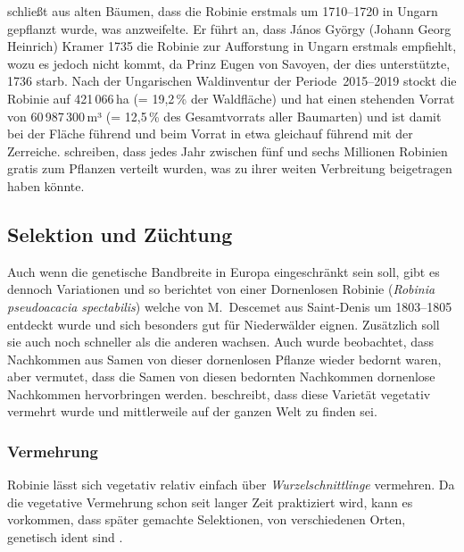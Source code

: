 \documentclass[twocolumn]{scrartcl}
\begin{document}
\citet[S.~3]{vadas1911robinie} schließt aus alten Bäumen, dass
die Robinie erstmals um 1710--1720 in Ungarn gepflanzt wurde, was
\citet[S.~179]{ernyey1926robinie} anzweifelte. Er führt an, dass
János György (Johann Georg Heinrich) Kramer 1735 die Robinie zur
Aufforstung in Ungarn erstmals empfiehlt, wozu es jedoch nicht kommt, da
Prinz Eugen von Savoyen, der dies unterstützte, 1736 starb. Nach der
Ungarischen Waldinventur \citep{waldinventur20152019ungarn} der
Periode~2015--2019 stockt die Robinie auf
421\,066\,ha (= 19,2\,\% der Waldfläche) und hat einen stehenden Vorrat von
60\,987\,300\,m³ (= 12,5\,\% des Gesamtvorrats aller Baumarten) und ist
damit bei der Fläche führend und beim Vorrat in etwa gleichauf führend
mit der Zerreiche. \cite{bund1899robinie,gaskil1906robinie} schreiben,
dass jedes Jahr
zwischen fünf und sechs Millionen Robinien gratis zum Pflanzen verteilt wurden,
was zu ihrer weiten Verbreitung beigetragen haben könnte.

\subsection{Selektion und Züchtung}

Auch wenn die genetische Bandbreite in Europa eingeschränkt sein soll,
gibt es dennoch Variationen und so berichtet
\citet[S.~259--260]{Michaux1813arbres} von einer Dornenlosen Robinie
(\emph{Robinia pseudoacacia spectabilis}) welche von M.~Descemet aus
Saint‑Denis um 1803--1805 entdeckt wurde und sich besonders gut für
Niederwälder eignen. Zusätzlich soll sie auch noch schneller als die
anderen wachsen. Auch wurde beobachtet, dass Nachkommen aus Samen von
dieser dornenlosen Pflanze wieder bedornt waren, aber
\citet{Michaux1813arbres} vermutet, dass die Samen von diesen
bedornten Nachkommen dornenlose Nachkommen hervorbringen
werden. \citet[S.~173]{quatrefages1861robinie} beschreibt, dass diese
Varietät vegetativ vermehrt wurde und mittlerweile auf der ganzen Welt
zu finden sei.

\subsubsection{Vermehrung}

Robinie lässt sich vegetativ relativ einfach über
\emph{Wurzelschnittlinge} vermehren. Da die vegetative Vermehrung
schon seit langer Zeit praktiziert wird, kann es vorkommen, dass
später gemachte Selektionen, von verschiedenen Orten, genetisch ident
sind \citep{liesebach2012robinie}.
\end{document}

